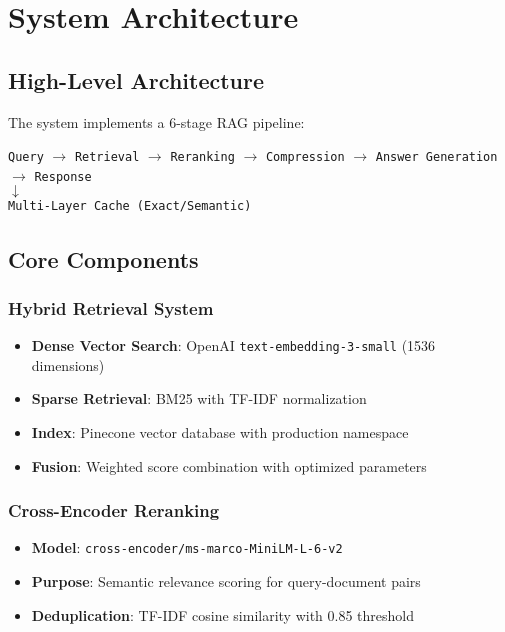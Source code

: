 \documentclass[11pt,a4paper]{article}
\begin{document}
\section{System Architecture}

\subsection{High-Level Architecture}

The system implements a 6-stage RAG pipeline:

\begin{center}
\texttt{Query} $\rightarrow$ \texttt{Retrieval} $\rightarrow$ \texttt{Reranking} $\rightarrow$ \texttt{Compression} $\rightarrow$ \texttt{Answer Generation} $\rightarrow$ \texttt{Response}\\
$\downarrow$\\
\texttt{Multi-Layer Cache (Exact/Semantic)}
\end{center}

\subsection{Core Components}

\subsubsection{Hybrid Retrieval System}
\begin{itemize}
    \item \textbf{Dense Vector Search}: OpenAI \texttt{text-embedding-3-small} (1536 dimensions)
    \item \textbf{Sparse Retrieval}: BM25 with TF-IDF normalization
    \item \textbf{Index}: Pinecone vector database with production namespace
    \item \textbf{Fusion}: Weighted score combination with optimized parameters
\end{itemize}

\subsubsection{Cross-Encoder Reranking}
\begin{itemize}
    \item \textbf{Model}: \texttt{cross-encoder/ms-marco-MiniLM-L-6-v2}
    \item \textbf{Purpose}: Semantic relevance scoring for query-document pairs
    \item \textbf{Deduplication}: TF-IDF cosine similarity with 0.85 threshold
\end{itemize}
\end{document}

